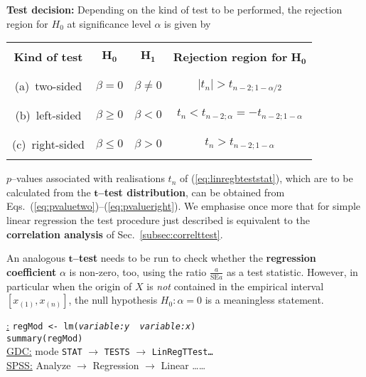 \medskip
\noindent
\textbf{Test decision:} Depending on the kind of test to be 
performed, the rejection region for $H_{0}$ at significance level 
$\alpha$ is given by
%
\begin{center}
\begin{tabular}[h]{c|c|c|c}
 & & & \\
\textbf{Kind of test} & $\boldsymbol{H_{0}}$ &
$\boldsymbol{H_{1}}$ &
\textbf{Rejection region for} $\boldsymbol{H_{0}}$ \\
 & & & \\
\hline
 & & & \\
(a)~two-sided & $\beta = 0$ & $\beta \neq 0$ &
$|t_{n}|>t_{n-2;1-\alpha/2}$ \\
 & & & \\
\hline
 & & & \\
(b)~left-sided & $\beta \geq 0$ & $\beta < 0$ &
$t_{n}<t_{n-2;\alpha}=-t_{n-2;1-\alpha}$ \\
 & & & \\
\hline
 & & & \\
(c)~right-sided & $\beta \leq 0$ & $\beta > 0$ &
$t_{n}>t_{n-2;1-\alpha}$ \\
 & & &
\end{tabular}
\end{center}
%
$p$--values associated with realisations $t_{n}$ of 
(\ref{eq:linregbteststat}), which are to be calculated from the
$\boldsymbol{t}$\textbf{--test distribution}, can be obtained from 
Eqs.~(\ref{eq:pvaluetwo})--(\ref{eq:pvalueright}). We emphasise 
once more that for simple linear regression the test procedure 
just described is equivalent to the \textbf{correlation analysis}
of Sec.~\ref{subsec:correlttest}.

\medskip
\noindent
An analogous \textbf{$\boldsymbol{t}$--test} needs to be run to
check whether the \textbf{regression coefficient} $\alpha$ is
non-zero, too, using the ratio $\displaystyle\frac{a}{\text{SE}a}$
as a test statistic. However, in particular when the origin of $X$
is \textit{not} contained in the empirical interval 
$[x_{(1)},x_{(n)}]$, the null hypothesis $H_{0}: \alpha=0$ is a 
meaningless statement.

\medskip
\noindent
\underline{\R:}
\texttt{regMod <- lm(\textit{variable:y}~\texttildelow~\textit{variable:x})} \\
\texttt{summary(regMod)} \\
\underline{GDC:} mode \texttt{STAT} $\rightarrow$ \texttt{TESTS}
$\rightarrow$ \texttt{LinRegTTest\ldots} \\
\underline{SPSS:} Analyze $\rightarrow$ Regression
$\rightarrow$ Linear \ldots\ldots

